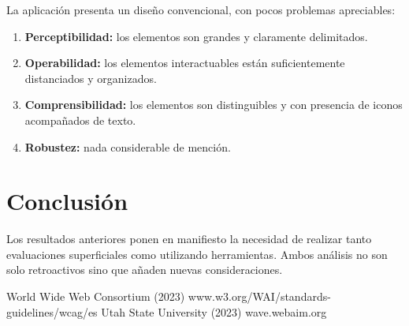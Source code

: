 \documentclass{article}
\begin{document}
        La aplicación presenta un diseño convencional, con pocos problemas
            apreciables:
        
        \begin{enumerate}
           \item \textbf{Perceptibilidad:} los elementos son grandes y claramente
                delimitados.
            \item \textbf{Operabilidad:} los elementos interactuables están
                suficientemente distanciados y organizados.
           \item \textbf{Comprensibilidad:} los elementos son distinguibles y con
                presencia de iconos acompañados de texto.
           \item \textbf{Robustez:} nada considerable de mención.
        \end{enumerate}

    \section{Conclusión}
    Los resultados anteriores ponen en manifiesto la necesidad de realizar
        tanto evaluaciones superficiales como utilizando herramientas. Ambos
        análisis no son solo retroactivos sino que añaden nuevas consideraciones.
    
    \newpage
    \begin{thebibliography}{9}
         World Wide Web Consortium (2023) www.w3.org/WAI/standards-guidelines/wcag/es
         Utah State University (2023) wave.webaim.org
        
    \end{thebibliography}
\end{document}
